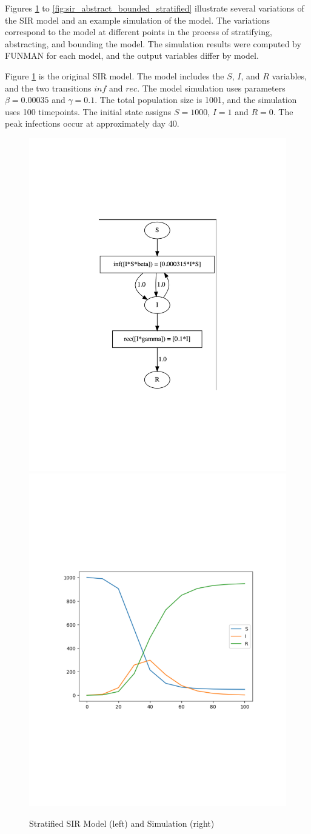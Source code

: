 

Figures \ref{fig:sir} to \ref{fig:sir_abstract_bounded_stratified} illustrate several variations of the SIR model and an example simulation of the model.  The variations correspond to the model at different points in the process of stratifying, abstracting, and bounding the model.  The simulation results were computed by FUNMAN for each model, and the output variables differ by model.

Figure \ref{fig:sir} is the original SIR model.  The model includes the $S$, $I$, and $R$ variables, and the two transitions $inf$ and $rec$.  The model simulation uses parameters $\beta = 0.00035$ and $\gamma = 0.1$.  The total population size is 1001, and the simulation uses 100 timepoints.  The initial state assigns $S=1000$, $I = 1$ and $R=0$.  The peak infections occur at approximately day 40.

\begin{figure}[t]
    \centering
    \includegraphics[width=0.3\linewidth,clip]{fig/sir/sir_model.pdf}
    \includegraphics[width=0.4\linewidth,clip]{fig/sir/sir_sim.pdf}

    \caption{\label{fig:sir} Stratified SIR Model (left) and Simulation (right)}
\end{figure}


